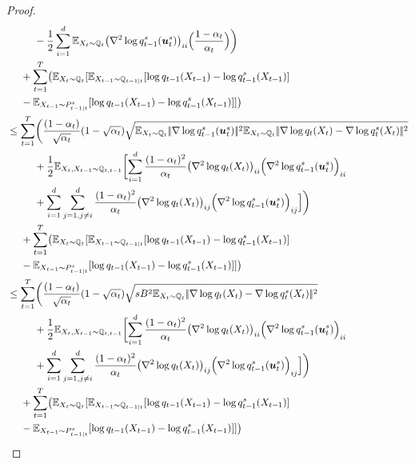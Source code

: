 \begin{proof}
\begin{align*}
       &~~~~~~~~-\frac{1}{2}\sum_{i=1}^{\Dim}  \E_{X_t\sim \Fd_{t}} \bigl(\nabla^2\log \Fdds_{t-1}(\us_t)\bigr)_{ii}\Bigl(\frac{1-\alpha_t}{\alpha_t}\Bigr)\biggr)  \\
 &~~~~+\sum_{t=1}^{T}\bigl(\E_{X_{t}\sim \Fd_{t}}[\E_{X_{t-1}\sim \Fd_{t-1|t}}[\log \Fdd_{t-1}(X_{t-1})-\log \Fdds_{t-1}(X_{t-1})]\\
    &~~~~-\E_{X_{t-1}\sim \Bds_{t-1|t}}[\log \Fdd_{t-1}(X_{t-1})-\log \Fdds_{t-1}(X_{t-1})]]\bigr)\\
       &\le \sum_{t=1}^T \biggl(\frac{(1-\alpha_t)}{\sqrt{\alpha_t}}(1-\sqrt{\alpha_t})\sqrt{\E_{X_t\sim \Fd_{t}}\norm{
    \nabla\log \Fdds_{t-1}(\us_t)}^2\E_{X_t\sim \Fd_{t}}\norm{\nabla\log \Fdd_t(X_t)-\nabla\log \Fdds_t(X_t)}^2}\\
    &~~~~~~~~+\frac{1}{2}\E_{X_t,X_{t-1}\sim \Fd_{t,t-1}}
    \biggl[\sum_{i=1}^{\Dim}\frac{(1-\alpha_t)^2}{\alpha_t}\bigl(\nabla^2 \log \Fdd_t(X_t)\bigr)_{ii} \Bigl(\nabla^2\log \Fdds_{t-1}(\us_t)\Bigr)_{ii}\\   &~~~~~~~~+\sum_{i=1}^{\Dim}\sum_{j=1,j\ne i}^{\Dim}\frac{(1-\alpha_t)^2}{\alpha_t}\bigl(\nabla^2 \log \Fdd_t(X_t)\bigr)_{ij} \Bigl(\nabla^2\log \Fdds_{t-1}(\us_t)\Bigr)_{ij}\Bigr]\biggr)\\
  &~~~~+\sum_{t=1}^{T}\bigl(\E_{X_{t}\sim \Fd_{t}}[\E_{X_{t-1}\sim \Fd_{t-1|t}}[\log \Fdd_{t-1}(X_{t-1})-\log \Fdds_{t-1}(X_{t-1})]\\
    &~~~~-\E_{X_{t-1}\sim \Bds_{t-1|t}}[\log \Fdd_{t-1}(X_{t-1})-\log \Fdds_{t-1}(X_{t-1})]]\bigr)\\
    &\le \sum_{t=1}^T \biggl(\frac{(1-\alpha_t)}{\sqrt{\alpha_t}}(1-\sqrt{\alpha_t})\sqrt{s\DerBound^2\E_{X_t\sim \Fd_{t}}\norm{\nabla\log \Fdd_t(X_t)-\nabla\log \Fdds_t(X_t)}^2}\\
    &~~~~~~~~+\frac{1}{2}\E_{X_t,X_{t-1}\sim \Fd_{t,t-1}}
    \biggl[\sum_{i=1}^{\Dim}\frac{(1-\alpha_t)^2}{\alpha_t}\bigl(\nabla^2 \log \Fdd_t(X_t)\bigr)_{ii} \Bigl(\nabla^2\log \Fdds_{t-1}(\us_t)\Bigr)_{ii}\\   &~~~~~~~~+\sum_{i=1}^{\Dim}\sum_{j=1,j\ne i}^{\Dim}\frac{(1-\alpha_t)^2}{\alpha_t}\bigl(\nabla^2 \log \Fdd_t(X_t)\bigr)_{ij} \Bigl(\nabla^2\log \Fdds_{t-1}(\us_t)\Bigr)_{ij}\Bigr]\biggr)\\
  &~~~~+\sum_{t=1}^{T}\bigl(\E_{X_{t}\sim \Fd_{t}}[\E_{X_{t-1}\sim \Fd_{t-1|t}}[\log \Fdd_{t-1}(X_{t-1})-\log \Fdds_{t-1}(X_{t-1})]\\
    &~~~~-\E_{X_{t-1}\sim \Bds_{t-1|t}}[\log \Fdd_{t-1}(X_{t-1})-\log \Fdds_{t-1}(X_{t-1})]]\bigr)\\

\end{align*}
\end{proof}
